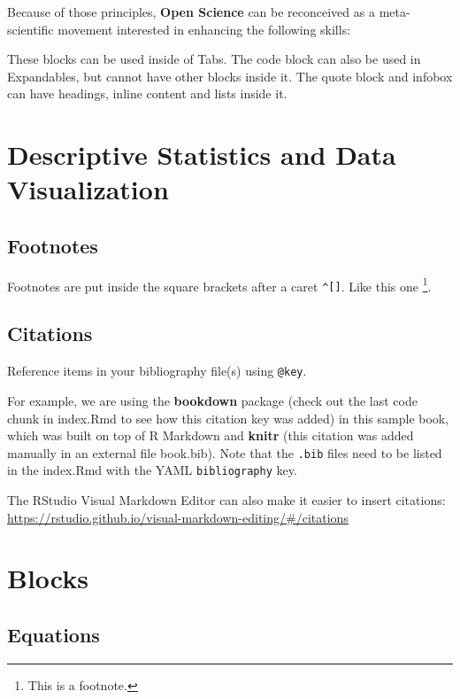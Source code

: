\documentclass[
]{book}
\theoremstyle{definition}
\theoremstyle{definition}
\theoremstyle{definition}
\theoremstyle{definition}
\theoremstyle{remark}
\begin{document}
Because of those principles, \textbf{Open Science} can be reconceived as a meta-scientific movement interested in enhancing the following skills:

These blocks can be used inside of Tabs. The code block can also be used in Expandables, but cannot have other blocks inside it. The quote block and infobox can have headings, inline content and lists inside it.

\hypertarget{descriptive-statistics-and-data-visualization}{%
\chapter{Descriptive Statistics and Data Visualization}\label{descriptive-statistics-and-data-visualization}}

\hypertarget{footnotes}{%
\section{Footnotes}\label{footnotes}}

Footnotes are put inside the square brackets after a caret \texttt{\^{}{[}{]}}. Like this one \footnote{This is a footnote.}.

\hypertarget{citations}{%
\section{Citations}\label{citations}}

Reference items in your bibliography file(s) using \texttt{@key}.

For example, we are using the \textbf{bookdown} package \citep{R-bookdown} (check out the last code chunk in index.Rmd to see how this citation key was added) in this sample book, which was built on top of R Markdown and \textbf{knitr} \citep{xie2015} (this citation was added manually in an external file book.bib).
Note that the \texttt{.bib} files need to be listed in the index.Rmd with the YAML \texttt{bibliography} key.

The RStudio Visual Markdown Editor can also make it easier to insert citations: \url{https://rstudio.github.io/visual-markdown-editing/\#/citations}

\hypertarget{blocks}{%
\chapter{Blocks}\label{blocks}}

\hypertarget{equations}{%
\section{Equations}\label{equations}}
\end{document}
